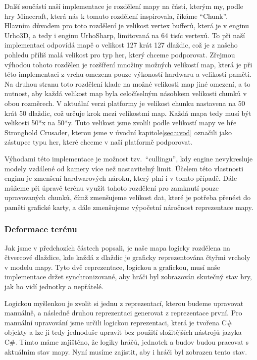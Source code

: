 Další součástí naší implementace je rozdělení mapy na části, kterým my, podle hry Minecraft, která nás k tomuto rozdělení inspirovala, říkáme ``Chunk''. Hlavním důvodem pro toto rozdělení je velikost vertex bufferů, která je v enginu Urho3D, a tedy i enginu UrhoSharp, limitovaná na 64 tisíc vertexů. To při naší implementaci odpovídá mapě o velikost 127 krát 127 dlaždic, což je z našeho pohledu příliš malá velikost pro typ her, který chceme podporovat. Zřejmou výhodou tohoto rozdělen je rozšíření množiny možných velikostí map, která je při této implementaci z vrchu omezena pouze výkoností hardwaru a velikostí paměti. Na druhou stranu toto rozdělení klade na možné velikosti map jiné omezení, a to nutnost, aby každá velikost map byla celočíselným násobkem velikosti chunků v obou rozměrech. V aktuální verzi platformy je velikost chunku nastavena na 50 krát 50 dlaždic, což určuje krok mezi velikostmi map. Každá mapa tedy musí být velikosti 50*x na 50*y. Tuto velikost jsme zvolili podle velikostí mapy ve hře Stronghold Crusader, kterou jsme v úvodní kapitole\ref{sec:uvod} označili jako zástupce typu her, které chceme v naší platformě podporovat.

Výhodami této implementace je možnost tzv.~``cullingu'', kdy engine nevykresluje modely vzdálené od kamery více než nastavitelný limit. Účelem této vlastnosti enginu je zmenšení hardwarových nároku, který plní i v tomto případě. Dále můžeme při úpravě terénu využít tohoto rozdělení pro zamknutí pouze upravovaných chunků, čímž zmenšujeme velikost dat, které je potřeba přenést do paměti grafické karty, a dále zmenšujeme výpočetní náročnost reprezentace mapy.

\subsubsection{Deformace terénu}
Jak jsme v předchozích částech popsali, je naše mapa logicky rozdělena na čtvercové dlaždice, kde každá z dlaždic je graficky reprezentována čtyřmi vrcholy v modelu mapy. Tyto dvě reprezentace, logickou a grafickou, musí naše implementace držet synchronizované, aby hráči byl zobrazován skutečný stav hry, jak ho vidí jednotky a nepřátelé. 

Logickou myšlenkou je zvolit si jednu z reprezentací, kterou budeme upravovat manuálně, a následně druhou reprezentaci generovat z reprezentace první. Pro manuální upravování jsme určili logickou reprezentaci, která je tvořena C\# objekty a lze ji tedy jednoduše upravit bez použití složitějších nástrojů jazyka C\#. Tímto máme zajištěno, že logiky hráčů, jednotek a budov budou pracovat s aktuálním stav mapy. Nyní musíme zajistit, aby i hráči byl zobrazen tento stav.

